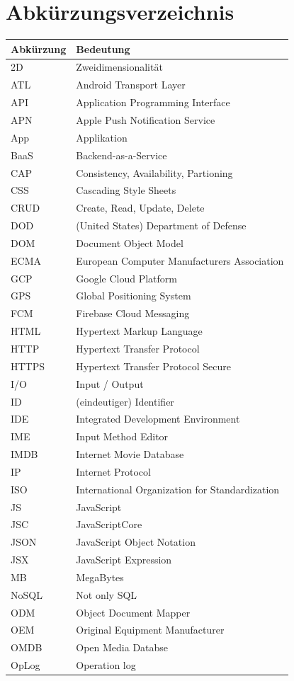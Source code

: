 \documentclass[11pt,a4paper]{article}
\begin{document}
\section*{Abkürzungsverzeichnis}
\noindent
\begin{center}
\begin{table}[h]
    \begin{tabular}{ l p{8cm} }
    \toprule
    \textbf{Abkürzung} & \textbf{Bedeutung} \\
    \midrule
2D    & Zweidimensionalität  \\
ATL   & Android Transport Layer \\
API   & Application Programming Interface \\
APN   & Apple Push Notification Service\\
App   & Applikation \\
BaaS  & Backend-as-a-Service \\
CAP   & Consistency, Availability, Partioning \\
CSS   & Cascading Style Sheets \\
CRUD  & Create, Read, Update, Delete \\
DOD   & (United States) Department of Defense \\
DOM   & Document Object Model \\
ECMA  & European Computer Manufacturers Association \\
GCP   & Google Cloud Platform \\
GPS   & Global Positioning System \\
FCM   & Firebase Cloud Messaging \\
HTML  & Hypertext Markup Language \\
HTTP  & Hypertext Transfer Protocol \\
HTTPS & Hypertext Transfer Protocol Secure \\
I/O   & Input / Output \\
ID    & (eindeutiger) Identifier \\
IDE   & Integrated Development Environment \\
IME   & Input Method Editor \\
IMDB  & Internet Movie Database \\
IP    & Internet Protocol \\
ISO   & International Organization for Standardization \\
JS    & JavaScript \\
JSC   & JavaScriptCore \\
JSON  & JavaScript Object Notation \\
JSX   & JavaScript Expression \\
MB    & MegaBytes \\
NoSQL & Not only SQL \\
ODM   & Object Document Mapper \\
OEM   & Original Equipment Manufacturer \\
OMDB  & Open Media Databse \\
OpLog & Operation log \\
	\end{tabular}
\end{table}
\end{center}
\clearpage
\end{document}
